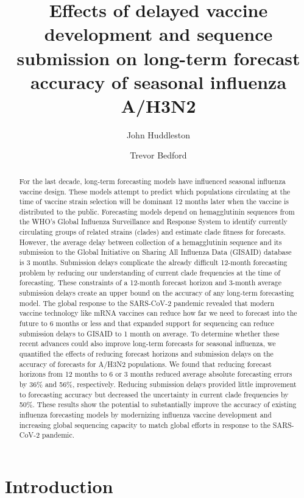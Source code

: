 \documentclass[9pt,lineno]{elife}
\title{Effects of delayed vaccine development and sequence submission on long-term forecast accuracy of seasonal influenza A/H3N2}
\author[1*]{John Huddleston}
\author[2]{Trevor Bedford}
\affil[1]{Vaccine and Infectious Disease Division, Fred Hutchinson Cancer Center, Seattle, WA, USA}
\affil[2]{Howard Hughes Medical Institute, Seattle, WA, USA}
\begin{document}
\maketitle

\begin{abstract}
For the last decade, long-term forecasting models have influenced seasonal influenza vaccine design.
These models attempt to predict which populations circulating at the time of vaccine strain selection will be dominant 12 months later when the vaccine is distributed to the public.
Forecasting models depend on hemagglutinin sequences from the WHO’s Global Influenza Surveillance and Response System to identify currently circulating groups of related strains (clades) and estimate clade fitness for forecasts.
However, the average delay between collection of a hemagglutinin sequence and its submission to the Global Initiative on Sharing All Influenza Data (GISAID) database is 3 months.
Submission delays complicate the already difficult 12-month forecasting problem by reducing our understanding of current clade frequencies at the time of forecasting.
These constraints of a 12-month forecast horizon and 3-month average submission delays create an upper bound on the accuracy of any long-term forecasting model.
The global response to the SARS-CoV-2 pandemic revealed that modern vaccine technology like mRNA vaccines can reduce how far we need to forecast into the future to 6 months or less and that expanded support for sequencing can reduce submission delays to GISAID to 1 month on average.
To determine whether these recent advances could also improve long-term forecasts for seasonal influenza, we quantified the effects of reducing forecast horizons and submission delays on the accuracy of forecasts for A/H3N2 populations.
We found that reducing forecast horizons from 12 months to 6 or 3 months reduced average absolute forecasting errors by 36\% and 56\%, respectively.
Reducing submission delays provided little improvement to forecasting accuracy but decreased the uncertainty in current clade frequencies by 50\%.
These results show the potential to substantially improve the accuracy of existing influenza forecasting models by modernizing influenza vaccine development and increasing global sequencing capacity to match global efforts in response to the SARS-CoV-2 pandemic.
\end{abstract}

\section{Introduction}
\end{document}
